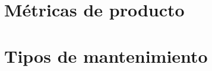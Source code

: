 \minitoc

    \section{Métricas de producto}\label{sec:tema-6.1---metricas-de-producto}
    

    \section{Tipos de mantenimiento}\label{sec:tipos-de-mantenimiento}
    

